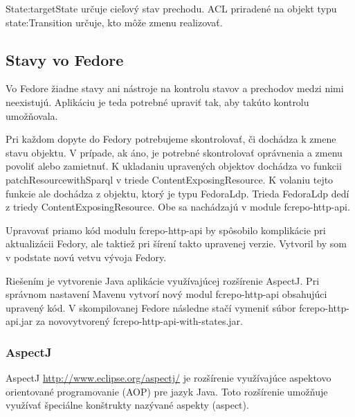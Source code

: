 \documentclass[thesis=M,slovak]{FITthesis}[2013/05/06]
\begin{document}
State:targetState určuje cieľový stav prechodu.
ACL priradené na objekt typu state:Transition určuje, kto môže zmenu realizovať.

\subsection{Stavy vo Fedore}
Vo Fedore žiadne stavy ani nástroje na kontrolu stavov a prechodov medzi nimi neexistujú. Aplikáciu je teda potrebné upraviť tak, aby takúto kontrolu umožňovala.

Pri každom dopyte do Fedory potrebujeme skontrolovať, či dochádza k zmene stavu objektu. V prípade, ak áno, je potrebné skontrolovať oprávnenia a zmenu povoliť alebo zamietnuť. K ukladaniu upravených objektov dochádza vo funkcii patchResourcewithSparql v triede ContentExposingResource.
K volaniu tejto funkcie ale dochádza z objektu, ktorý je typu FedoraLdp. Trieda FedoraLdp dedí z triedy ContentExposingResource. Obe sa nachádzajú v module fcrepo-http-api.

Upravovať priamo kód modulu fcrepo-http-api by spôsobilo komplikácie pri aktualizácii Fedory, ale taktiež pri šírení takto upravenej verzie. Vytvoril by som v podstate novú vetvu vývoja Fedory.

Riešením je vytvorenie Java aplikácie využívajúcej rozšírenie AspectJ. Pri správnom nastavení Mavenu vytvorí nový modul fcrepo-http-api obsahujúci upravený kód. V skompilovanej Fedore následne stačí vymeniť súbor fcrepo-http-api.jar za novovytvorený fcrepo-http-api-with-states.jar.

\subsubsection{AspectJ}
AspectJ \url{http://www.eclipse.org/aspectj/} je rozšírenie využívajúce aspektovo orientované programovanie (AOP) pre jazyk Java. Toto rozšírenie umožňuje využívať špeciálne konštrukty nazývané aspekty (aspect).
\end{document}
